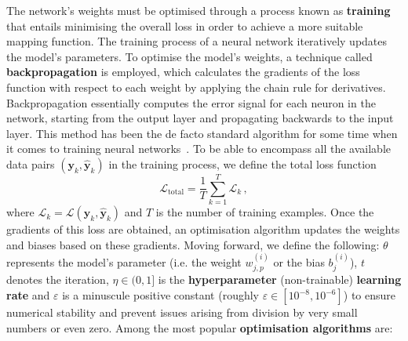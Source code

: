 The network's weights must be optimised through a process known as \textbf{training} that entails minimising the overall loss in order to achieve a more suitable mapping function. The training process of a neural network iteratively updates the model's parameters. To optimise the model's weights, a technique called \textbf{backpropagation} is employed, which calculates the gradients of the loss function with respect to each weight by applying the chain rule for derivatives. Backpropagation essentially computes the error signal for each neuron in the network, starting from the output layer and propagating backwards to the input layer. This method has been the de facto standard algorithm for some time when it comes to training neural networks~\supercite{backprop1,backprop2}. To be able to encompass all the available data pairs $\left( \symbf{y}_k, \symbf{\hat{y}}_k \right)$ in the training process, we define the total loss function
\begin{equation}
    \mathcal{L}_{\text{total}} = \dfrac{1}{T} \sum\limits_{k = 1}^{T} \mathcal{L}_k\,,
\end{equation}
\noindent where $\mathcal{L}_k = \mathcal{L}\left( \symbf{y}_k, \symbf{\hat{y}}_k \right)$ and $T$ is the number of training examples. Once the gradients of this loss are obtained, an optimisation algorithm updates the weights and biases based on these gradients. Moving forward, we define the following: $\theta$ represents the model's parameter (i.e. the weight $w_{j,p}^{(i)}$ or the bias $b_j^{(i)}$), $t$ denotes the iteration, $\eta \in (0, 1]$ is the \textbf{hyperparameter} (non-trainable) \textbf{learning rate} and $\varepsilon$ is a minuscule positive constant (roughly $\varepsilon \in [10^{-8}, 10^{-6}]$) to ensure numerical stability and prevent issues arising from division by very small numbers or even zero. Among the most popular \textbf{optimisation algorithms} are:
\newcommand{\weight}{\theta}
\newcommand{\lrdelta}[2]{\eta\cdot \partderiv{#1}{#2}}
\newcommand{\deriv}{\partderiv{\mathcal{L}^{[b]}}{\weight_{t}}}
\vspace{0.25cm}
